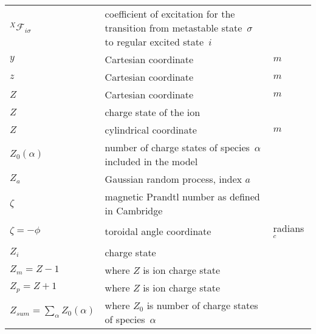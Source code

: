 \begin{longtable}{|p{3.0cm}|p{10.0cm}|p{3.0cm}|}
$^X\mathcal{F}_{i\sigma}$ & coefficient of excitation for the transition from metastable state~$\sigma$ to regular excited state~$i$  & \\
$y$ & Cartesian coordinate  & $m$ \\
$z$ & Cartesian coordinate  & $m$ \\
$Z$ & Cartesian coordinate  & $m$ \\
$Z$ & charge state of the ion & \\
$Z$ & cylindrical coordinate  & $m$ \\
$Z_0(\alpha)$ & number of charge states of species~$\alpha$ included in the model & \\
$Z_a$ & Gaussian random process, index $a$  & \\
$\zeta$ & magnetic Prandtl number as defined in Cambridge & \\
$\zeta=-\phi$ & toroidal angle coordinate & radians $^c$ \\
$Z_i$ & charge state & \\
$Z_m=Z-1$ & where $Z$ is ion charge state & \\
$Z_p=Z+1$ & where $Z$ is ion charge state & \\
$Z_{sum}=\sum_\alpha Z_0(\alpha)$ & where $Z_0$ is number of charge states of species~$\alpha$ & \\
\hline
\end{longtable}
